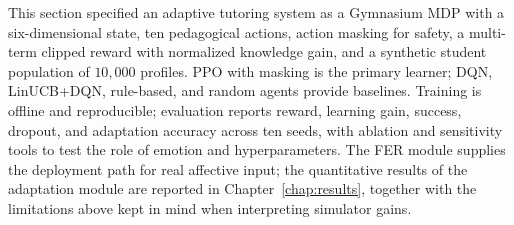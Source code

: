 This section specified an adaptive tutoring system as a Gymnasium MDP with a six-dimensional state, ten pedagogical actions, action masking for safety, a multi-term clipped reward with normalized knowledge gain, and a synthetic student population of $10{,}000$ profiles. PPO with masking is the primary learner; DQN, LinUCB+DQN, rule-based, and random agents provide baselines. Training is offline and reproducible; evaluation reports reward, learning gain, success, dropout, and adaptation accuracy across ten seeds, with ablation and sensitivity tools to test the role of emotion and hyperparameters. The FER module supplies the deployment path for real affective input; the quantitative results of the adaptation module are reported in Chapter~\ref{chap:results}, together with the limitations above kept in mind when interpreting simulator gains.

